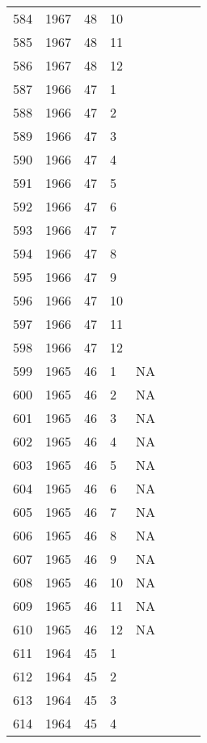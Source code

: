 \begin{longtable}{ |l|l|l|l|l|l|l|l| }
584 & 1967 & 48 &    10 &         &  &  & \\
585 & 1967 & 48 &    11 &         &  &  & \\
586 & 1967 & 48 &    12 &         &  &  & \\
587 & 1966 & 47 &     1 &         &  &  & \\
588 & 1966 & 47 &     2 &         &  &  & \\
589 & 1966 & 47 &     3 &         &  &  & \\
590 & 1966 & 47 &     4 &         &  &  & \\
591 & 1966 & 47 &     5 &         &  &  & \\
592 & 1966 & 47 &     6 &         &  &  & \\
593 & 1966 & 47 &     7 &         &  &  & \\
594 & 1966 & 47 &     8 &         &  &  & \\
595 & 1966 & 47 &     9 &         &  &  & \\
596 & 1966 & 47 &    10 &         &  &  & \\
597 & 1966 & 47 &    11 &         &  &  & \\
598 & 1966 & 47 &    12 &         &  &  & \\
599 & 1965 & 46 &     1 &      NA &  &  & \\
600 & 1965 & 46 &     2 &      NA &  &  & \\
601 & 1965 & 46 &     3 &      NA &  &  & \\
602 & 1965 & 46 &     4 &      NA &  &  & \\
603 & 1965 & 46 &     5 &      NA &  &  & \\
604 & 1965 & 46 &     6 &      NA &  &  & \\
605 & 1965 & 46 &     7 &      NA &  &  & \\
606 & 1965 & 46 &     8 &      NA &  &  & \\
607 & 1965 & 46 &     9 &      NA &  &  & \\
608 & 1965 & 46 &    10 &      NA &  &  & \\
609 & 1965 & 46 &    11 &      NA &  &  & \\
610 & 1965 & 46 &    12 &      NA &  &  & \\
611 & 1964 & 45 &     1 &         &  &  & \\
612 & 1964 & 45 &     2 &         &  &  & \\
613 & 1964 & 45 &     3 &         &  &  & \\
614 & 1964 & 45 &     4 &         &  &  & \\

\end{longtable}
